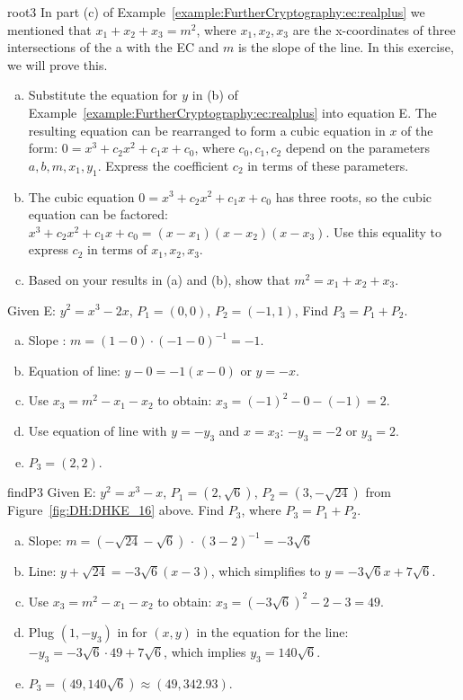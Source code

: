 \begin{exercise}{root3}
In part (c) of Example~\ref{example:FurtherCryptography:ec:realplus} we mentioned that $x_1+x_2+x_3=m^2$, where $x_1,x_2,x_3$ are the x-coordinates of three intersections of the a with the EC and $m$ is the slope of the line.  In this exercise, we will prove this.
\begin{enumerate}[(a)]
\item
Substitute the equation for $y$ in (b) of Example~\ref{example:FurtherCryptography:ec:realplus} into equation E. The resulting equation can be rearranged to form a cubic equation in $x$ of the form: $0 = x^3 + c_2 x^2 + c_1 x + c_0$, where $c_0,c_1, c_2$ depend on the parameters $a,b,m,x_1,y_1$. Express the coefficient $c_2$ in terms of these parameters.
\item
The cubic equation $0 = x^3 + c_2 x^2 + c_1 x + c_0$ has three roots, so the cubic equation can be factored:  $x^3 + c_2 x^2 + c_1 x + c_0 = (x-x_1)(x-x_2)(x-x_3)$. Use this equality to express $c_2$ in terms of $x_1, x_2, x_3$.
\item
Based on your results in (a) and (b), show that $m^2 = x_1 + x_2 + x_3$.
\end{enumerate}
\end{exercise}

\begin{example}{} 
Given E: $y^2 = x^3 - 2x$, $P_1 = (0,0)$, $P_2 = (-1,1)$, Find $P_3=P_1 + P_2$.
		
\begin{enumerate}[(a)]
\item
Slope :
$ m =(1 - 0) \cdot (-1- 0)^{-1}=-1$.
\item
Equation of line:	$y - 0 = -1(x- 0)$ or $y =-x $.
\item
Use $x_3 = m^2 - x_1 - x_2$ to obtain: $x_3 = (-1)^2 - 0 - (-1) = 2$.
\item
Use equation of line with $y=-y_3$ and $x=x_3$:  $-y_3 = -2$ or $y_3=2$.
\item
$P_3 = (2,2)$.
\end{enumerate}
\end{example}
\begin{example}{findP3} Given E: $y^2 = x^3 - x$, $P_1 = (2, \sqrt{6})$, $P_2 = (3, -\sqrt{24})$ from Figure~\ref{fig:DH:DHKE_16} above.
	Find $P_3$, where $P_3 = P_1 + P_2$.
\begin{enumerate}[(a)]
\item 
Slope: $m =( -\sqrt{24}-\sqrt{6})$ $\cdot$ $(3-2)^{-1} = -3\sqrt{6}  $ \\
\item
Line: $y + \sqrt{24} = -3\sqrt{6}(x - 3)$, which simplifies to $y = -3\sqrt{6}x + 7\sqrt{6}$.
\item 
Use $x_3 = m^2 - x_1 - x_2$ to obtain: $x_3 = (-3\sqrt{6})^2 - 2 - 3 = 49$.
\item
Plug $(1,-y_3)$ in for $(x,y)$ in the equation for the line: $-y_3 = -3\sqrt{6}\cdot 49+7 \sqrt{6}$, which implies $y_3 = 140\sqrt{6}$. 
\item
$P_3 = (49,140\sqrt{6}) \approx (49,342.93)$.
\end {enumerate}  
\end{example}

